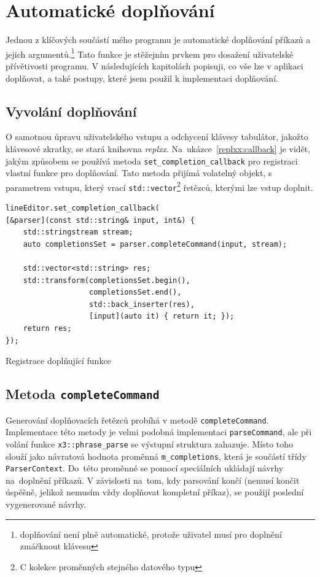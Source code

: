 \documentclass[thesis=B,czech,hidelinks]{FITthesis}[2019/03/06]
\newcommand{\Rplus}{\protect\hspace{-.1em}\protect\raisebox{.35ex}{\smaller{\smaller\textbf{+}}}}
\newcommand{\Cpp}{\mbox{C\Rplus\Rplus}\xspace}
\begin{document}
\section{Automatické doplňování}\label{completion}
Jednou z klíčových součástí mého programu je automatické doplňování příkazů a jejich argumentů.\footnote{doplňování není plně automatické, protože uživatel musí pro doplnění zmáčknout klávesu} Tato funkce je stěžejním prvkem pro dosažení uživatelské přívětivosti programu. V následujících kapitolách popisuji, co vše lze v aplikaci doplňovat, a také postupy, které jsem použil k implementaci doplňování.

\subsection{Vyvolání doplňování}
O samotnou úpravu uživatelského vstupu a odchycení klávesy tabulátor, jakožto klávesové zkratky, se stará knihovna \textit{replxx}. Na~ukázce~\ref{replxx:callback} je vidět, jakým způsobem se používá metoda \texttt{set\_completion\_callback} pro registraci vlastní funkce pro doplňování. Tato metoda přijímá volatelný objekt, s parametrem vstupu, který vrací \texttt{std::vector}\footnote{\Cpp{} kolekce proměnných stejného datového typu} řetězců, kterými lze vstup doplnit.

\begin{listing}[H]
\begin{verbatim}
lineEditor.set_completion_callback(
[&parser](const std::string& input, int&) {
    std::stringstream stream;
    auto completionsSet = parser.completeCommand(input, stream);

    std::vector<std::string> res;
    std::transform(completionsSet.begin(),
                   completionsSet.end(),
                   std::back_inserter(res),
                   [input](auto it) { return it; });
    return res;
});
\end{verbatim}
\caption{Registrace doplňující funkce}\label{replxx:callback}
\end{listing}

\subsection{Metoda \texttt{completeCommand}}
Generování doplňovacích řetězců probíhá v metodě \texttt{completeCommand}. Implementace této metody je velmi podobná implementaci \texttt{parseCommand}, ale při volání funkce \texttt{x3::phrase\_parse} se výstupní struktura zahazuje. Místo toho slouží jako návratová hodnota proměnná \texttt{m\_completions}, která je součástí třídy \texttt{ParserContext}. Do~této proměnné se pomocí speciálních  ukládají návrhy na~doplnění příkazů. V závislosti na~tom, kdy parsování končí (nemusí končit úspěšně, jelikož nemusím vždy doplňovat kompletní příkaz), se použijí poslední vygenerované návrhy.
\end{document}
